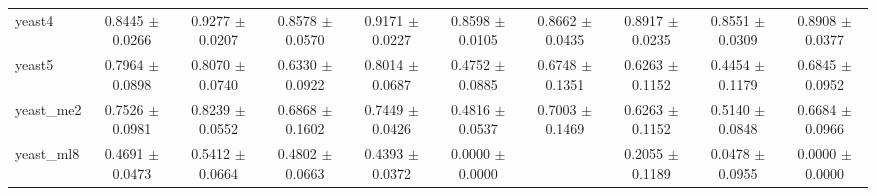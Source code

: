 \begin{table*}[htbp]
\begin{tabular}{lccccccccc}
            yeast4 & 0.8445 $\pm$ 0.0266 & 0.9277 $\pm$ 0.0207 & 0.8578 $\pm$ 0.0570 & 0.9171 $\pm$ 0.0227 & 0.8598 $\pm$ 0.0105 & 0.8662 $\pm$ 0.0435 & 0.8917 $\pm$ 0.0235 & 0.8551 $\pm$ 0.0309 & 0.8908 $\pm$ 0.0377 \\ 
            yeast5 & 0.7964 $\pm$ 0.0898 & 0.8070 $\pm$ 0.0740 & 0.6330 $\pm$ 0.0922 & 0.8014 $\pm$ 0.0687 & 0.4752 $\pm$ 0.0885 & 0.6748 $\pm$ 0.1351 & 0.6263 $\pm$ 0.1152 & 0.4454 $\pm$ 0.1179 & 0.6845 $\pm$ 0.0952 \\ 
            yeast\_me2 & 0.7526 $\pm$ 0.0981 & 0.8239 $\pm$ 0.0552 & 0.6868 $\pm$ 0.1602 & 0.7449 $\pm$ 0.0426 & 0.4816 $\pm$ 0.0537 & 0.7003 $\pm$ 0.1469 & 0.6263 $\pm$ 0.1152 & 0.5140 $\pm$ 0.0848 & 0.6684 $\pm$ 0.0966 \\ 
            yeast\_ml8 & 0.4691 $\pm$ 0.0473 & 0.5412 $\pm$ 0.0664 & 0.4802 $\pm$ 0.0663 & 0.4393 $\pm$ 0.0372 & 0.0000 $\pm$ 0.0000 &  & 0.2055 $\pm$ 0.1189 & 0.0478 $\pm$ 0.0955 & 0.0000 $\pm$ 0.0000 \\ 
        \bottomrule
    \end{tabular}
\end{table*}
